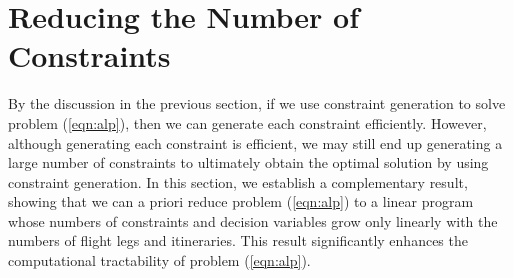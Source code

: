 \section{Reducing the Number of Constraints}
\label{sec:reduce}

By the discussion in the previous section, if we use constraint generation to solve problem (\ref{eqn:alp}), then we can generate each constraint efficiently. However, although generating each constraint is efficient, we may still end up generating a large number of constraints to ultimately obtain the optimal solution by using constraint generation. In this section, we establish a complementary result, showing that we can a priori reduce problem (\ref{eqn:alp}) to a linear program whose numbers of constraints and decision variables grow only linearly with the numbers of flight legs and itineraries. This result significantly enhances the computational tractability of problem (\ref{eqn:alp}). 


